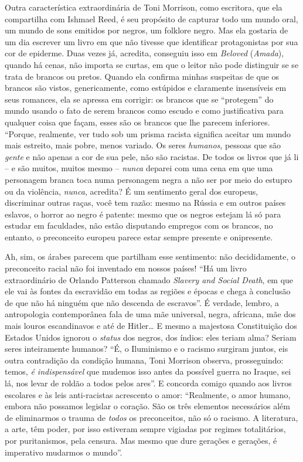 \documentclass[
  letterpaper,
  DIV=11,
  numbers=noendperiod]{scrreprt}
\begin{document}
Outra característica extraordinária de Toni Morrison, como escritora,
que ela compartilha com Ishmael Reed, é seu propósito de capturar todo
um mundo oral, um mundo de sons emitidos por negros, um folklore negro.
Mas ela gostaria de um dia escrever um livro em que não tivesse que
identificar protagonistas por sua cor de epiderme. Duas vezes já,
acredita, conseguiu isso em \emph{Beloved} (\emph{Amada}), quando há
cenas, não importa se curtas, em que o leitor não pode distinguir se se
trata de brancos ou pretos. Quando ela confirma minhas suspeitas de que
os brancos são vistos, genericamente, como estúpidos e claramente
insensíveis em seus romances, ela se apressa em corrigir: os brancos que
se ``protegem'' do mundo usando o fato de serem brancos como escudo e
como justificativa para qualquer coisa que façam, esses são os brancos
que lhe parecem inferiores. ``Porque, realmente, ver tudo sob um prisma
racista significa aceitar um mundo mais estreito, mais pobre, menos
variado. Os seres \emph{humanos}, pessoas que são \emph{gente} e não
apenas a cor de sua pele, não são racistas. De todos os livros que já li
-- e são muitos, muitos mesmo -- \emph{nunca} deparei com uma cena em
que uma personagem branca toca numa personagem negra a não ser por meio
do estupro ou da violência, \emph{nunca}, acredita? É um sentimento
geral dos europeus, discriminar outras raças, você tem razão: mesmo na
Rússia e em outros países eslavos, o horror ao negro é patente: mesmo
que os negros estejam lá só para estudar em faculdades, não estão
disputando empregos com os brancos, no entanto, o preconceito europeu
parece estar sempre presente e onipresente.

Ah, sim, os árabes parecem que partilham esse sentimento: não
decididamente, o preconceito racial não foi inventado em nossos países!
``Há um livro extraordinário de Orlando Patterson chamado \emph{Slavery
and Social Death}, em que ele vai às fontes da escravidão em todas as
regiões e épocas e chega à conclusão de que não há ninguém que não
descenda de escravos''. É verdade, lembro, a antropologia contemporânea
fala de uma mãe universal, negra, africana, mãe dos mais louros
escandinavos e até de Hitler\ldots{} E mesmo a majestosa Constituição
dos Estados Unidos ignorou o \emph{status} dos negros, dos índios: eles
teriam alma? Seriam seres inteiramente humanos? ``É, o Iluminismo e o
racismo surgiram juntos, eis outra contradição da condição humana, Toni
Morrison observa, prosseguindo: temos, \emph{é indispensável} que
mudemos isso antes da possível guerra no Iraque, sei lá, nos levar de
roldão a todos pelos ares''. E concorda comigo quando aos livros
escolares e às leis anti-racistas acrescento o amor: ``Realmente, o amor
humano, embora não possamos legislar o coração. São os três elementos
necessários além de eliminarmos o trauma de \emph{todos} os
preconceitos, não só o racismo. A literatura, a arte, têm poder, por
isso estiveram sempre vigiadas por regimes totalitários, por
puritanismos, pela censura. Mas mesmo que dure gerações e gerações, é
imperativo mudarmos o mundo''.
\end{document}
